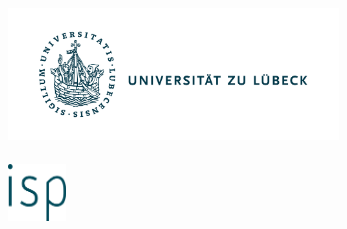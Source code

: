 %


\begin{titlepage}
    \tgherosfont
    \centering

    {\Large \thesisUniversity} \\[4mm]
    \includegraphics[height=3.5cm]{gfx/Logo_Uni_Luebeck}\\[3mm]
    \textsf{\thesisUniversityInstitute} \\[4mm]
    \includegraphics[height=1.5cm]{gfx/Logo_isp} \\[1mm]

    \vfill
    {\large \thesisSubject} \\[5mm]
    {\LARGE \color{ctcolortitle}\textbf{\thesisTitle} \\[10mm]}
    {\Large \thesisName} \\


\end{titlepage}
